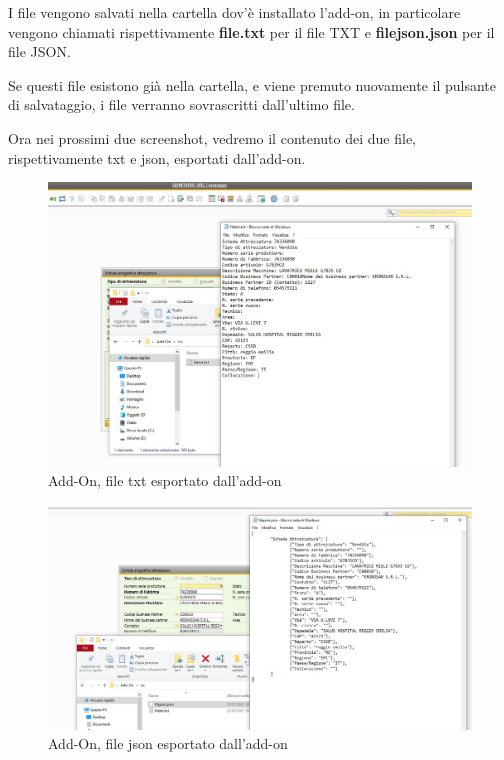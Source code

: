 \begin{flushleft}
	I file vengono salvati nella cartella dov'è installato l'add-on, in particolare vengono chiamati rispettivamente \textbf{file.txt} per il file TXT e \textbf{filejson.json} per il file JSON.
	
	Se questi file esistono già nella cartella, e viene premuto nuovamente il pulsante di salvataggio, i file verranno sovrascritti dall'ultimo file.
	
\end{flushleft}

\newpage

\begin{flushleft}
	
	Ora nei prossimi due screenshot, vedremo il contenuto dei due file, rispettivamente txt e json, esportati dall'add-on.
	
\end{flushleft}
\begin{figure}[!h] 
	\centering 
	\includegraphics[scale = 0.38]{immagini/add-on/addon-esporta-txt.jpg} 
	\caption{Add-On, file txt esportato dall'add-on}
\end{figure}

\begin{figure}[!h] 
	\centering 
	\includegraphics[scale = 0.38]{immagini/add-on/addon-esporta-json.jpg} 
	\caption{Add-On, file json esportato dall'add-on}
\end{figure}

